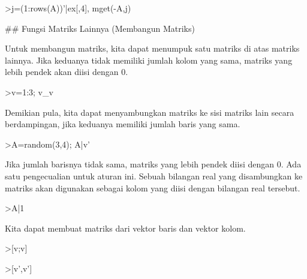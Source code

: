 \documentclass[a4paper,10pt]{article}
\begin{document}
\begin{eulernotebook}
\begin{euleroutput}
\end{euleroutput}
\begin{eulerprompt}
>j=(1:rows(A))'|ex[,4], mget(-A,j)
\end{eulerprompt}
\begin{euleroutput}
  
  ## Fungsi Matriks Lainnya (Membangun Matriks)
  
  Untuk membangun matriks, kita dapat menumpuk satu matriks di atas matriks lainnya. Jika keduanya tidak memiliki jumlah kolom yang sama, matriks yang lebih pendek akan diisi dengan 0.
  
\end{euleroutput}
\begin{eulerprompt}
>v=1:3; v_v
\end{eulerprompt}
\begin{euleroutput}
  
  Demikian pula, kita dapat menyambungkan matriks ke sisi matriks lain secara berdampingan, jika keduanya memiliki jumlah baris yang sama.
  
\end{euleroutput}
\begin{eulerprompt}
>A=random(3,4); A|v'
\end{eulerprompt}
\begin{euleroutput}
  
  Jika jumlah barisnya tidak sama, matriks yang lebih pendek diisi dengan 0. Ada satu pengecualian untuk aturan ini. Sebuah bilangan real yang disambungkan ke matriks akan digunakan sebagai kolom yang diisi dengan bilangan real tersebut.
  
\end{euleroutput}
\begin{eulerprompt}
>A|1
\end{eulerprompt}
\begin{euleroutput}
  
  Kita dapat membuat matriks dari vektor baris dan vektor kolom.
  
\end{euleroutput}
\begin{eulerprompt}
>[v;v]
\end{eulerprompt}
\begin{euleroutput}
  
\end{euleroutput}
\begin{eulerprompt}
>[v',v']
\end{eulerprompt}
\begin{euleroutput}
  

\end{euleroutput}
\end{eulernotebook}
\end{document}
